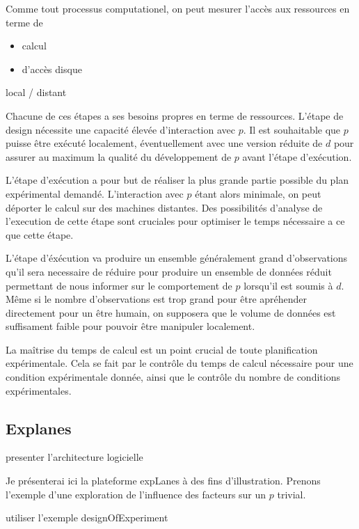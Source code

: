 Comme tout processus computationel, on peut mesurer l'accès aux ressources en terme de
\begin{itemize}
  \item calcul
  \item d'accès disque
\end{itemize}

local / distant

Chacune de ces étapes a ses besoins propres en terme de ressources. L'étape de design nécessite une capacité élevée d'interaction avec $p$. Il est souhaitable que $p$ puisse être exécuté localement, éventuellement avec une version réduite de $d$ pour assurer au maximum la qualité du développement de $p$ avant l'étape d'exécution.

L'étape d'exécution a pour but de réaliser la plus grande partie possible du plan expérimental demandé. L'interaction avec $p$ étant alors minimale, on peut déporter le calcul sur des machines distantes. Des possibilités d'analyse de l'execution de cette étape sont cruciales pour optimiser le temps nécessaire a ce que cette étape.

L'étape d'éxécution va produire un ensemble généralement grand d'observations qu'il sera necessaire de réduire pour produire un ensemble de données réduit permettant de nous informer sur le comportement de $p$ lorsqu'il est soumis à $d$. Même si le nombre d'observations est trop grand pour être apréhender directement pour un être humain, on supposera que le volume de données est suffisament faible pour pouvoir être manipuler localement.

La maîtrise du temps de calcul est un point crucial de toute planification expérimentale. Cela se fait par le contrôle du temps de calcul nécessaire pour une condition expérimentale donnée, ainsi que le contrôle du nombre de conditions expérimentales.

\subsection{Explanes}

presenter l'architecture logicielle

Je présenterai ici la plateforme expLanes à des fins d'illustration. Prenons l'exemple d'une exploration de l'influence des facteurs sur un $p$ trivial.

utiliser l'exemple designOfExperiment

